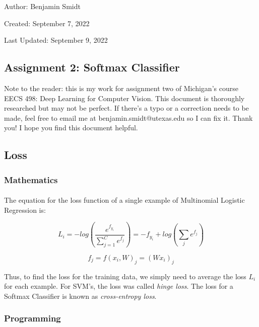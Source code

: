 \documentclass[12pt]{article}
\begin{document}
\noindent Author: Benjamin Smidt

\noindent Created: September 7, 2022

\noindent Last Updated: September 9, 2022
\begin{center}
\section*{Assignment 2: Softmax Classifier}
\end{center}

\noindent Note to the reader: this is my work for assignment two of Michigan's course
EECS 498: Deep Learning for Computer Vision. This document is thoroughly researched but
may not be perfect. If there's a typo or a correction needs to be made, feel free to 
email me at benjamin.smidt@utexas.edu so I can fix it. Thank you! I hope you find this 
document helpful.
\paragraph{}
\subsection*{Loss}
\subsubsection{Mathematics}

\paragraph{}
The equation for the loss function of a single example of 
Multinomial Logistic Regression is:  

\begin{equation}
    L_{i} = -log(\frac{e^{f_{y_{i}}}}{\sum_{j=1}^C e^{f_j}}) 
    = -f_{y_{i}} + log(\sum_{j} e^{f_{j}})
\end{equation}

\begin{equation}
    f_j = f(x_{i}, W)_j = (Wx_{i})_j
\end{equation}

\noindent Thus, to find the loss for the training data, we simply need 
to average the loss $L_{i}$ for each example. For SVM's, the loss was 
called \emph{hinge loss}. The loss for a Softmax Classifier is known as 
\emph{cross-entropy loss}. 

\subsubsection{Programming}
\end{document}
